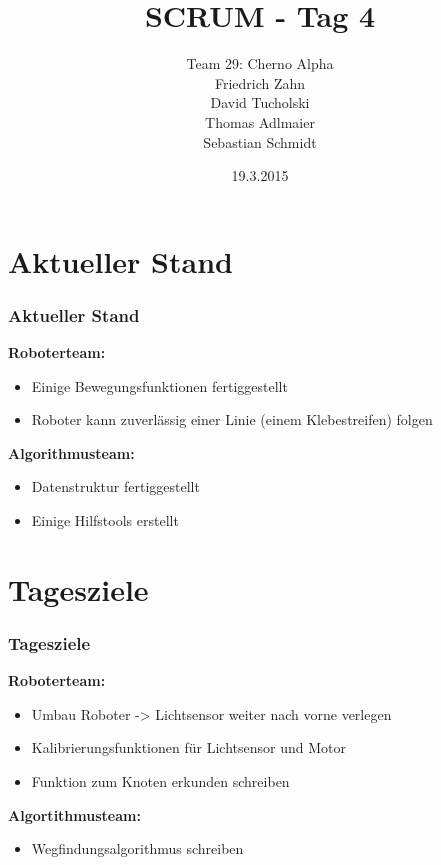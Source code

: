 \documentclass[ddcfooter,nototalpage]{tudbeamer}
\begin{document}
\title{SCRUM - Tag 4}
\author{Team 29: Cherno Alpha \\
Friedrich Zahn \\
David Tucholski \\
Thomas Adlmaier \\
Sebastian Schmidt
}
\date{19.3.2015}
\maketitle
\section{Aktueller Stand}
\begin{frame}
\frametitle{Aktueller Stand}
\normalsize

\textbf{Roboterteam:}
\begin{itemize}
\item Einige Bewegungsfunktionen fertiggestellt
\item Roboter kann zuverlässig einer Linie (einem Klebestreifen) folgen

\end{itemize}
\textbf{Algorithmusteam:}
\begin{itemize}
\item Datenstruktur fertiggestellt
\item Einige Hilfstools erstellt
\end{itemize}
\end{frame}
\section{Tagesziele}
\begin{frame}
\frametitle{Tagesziele}
\normalsize
\textbf{Roboterteam:}
\begin{itemize}
\item Umbau Roboter -> Lichtsensor weiter nach vorne  verlegen
\item Kalibrierungsfunktionen für Lichtsensor und Motor
\item Funktion zum Knoten erkunden schreiben

\end{itemize}
\textbf{Algortithmusteam:}
\begin{itemize}
\item Wegfindungsalgorithmus schreiben
\end{itemize}
\end{frame}
\end{document}

